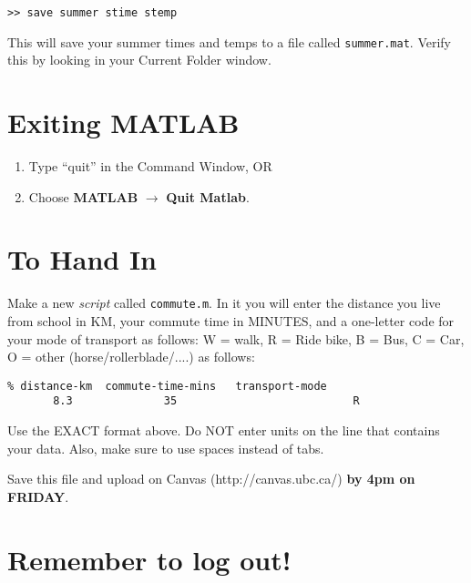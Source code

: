 \documentclass[letterpaper]{article}
\begin{document}
\begin{verbatim}
>> save summer stime stemp
\end{verbatim}

This will save your summer times and temps to a file called \verb+summer.mat+.  Verify this by looking in your Current Folder window.

\section {Exiting MATLAB}

\begin {enumerate} 
\item Type ``quit'' in the Command Window,   OR  
\item Choose {\bf MATLAB} $\rightarrow$ {\bf Quit Matlab}.
\end{enumerate}

\section{To Hand In}

Make a new {\it script} called \verb+commute.m+. In it you will enter the distance you live from school in KM, your commute time in MINUTES, and 
a one-letter code for your mode of transport as follows:  W = walk, R = Ride bike, B = Bus, C = Car, O = other (horse/rollerblade/....) as follows:

\begin{verbatim}
% distance-km  commute-time-mins   transport-mode
       8.3              35				             R                             
\end{verbatim}

Use the EXACT format above.  Do NOT enter units
on the line that contains your data. Also, make sure to use spaces instead of tabs.

Save this file and upload on Canvas (http://canvas.ubc.ca/) {\bf by 4pm on FRIDAY}.   
     
\section {Remember to log out!}
\end{document}
